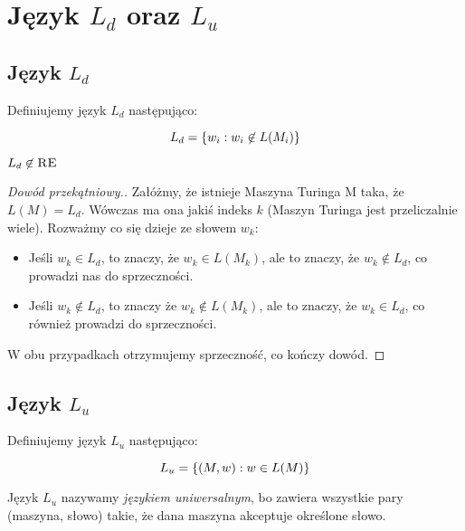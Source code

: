 \section{Język \texorpdfstring{\( L_d \)}{Ld} oraz \texorpdfstring{\(L_u\)}{Lu}}

\subsection{Język \texorpdfstring{\( L_d \)}{Ld}}

\begin{definition}
	Definiujemy język \(L_d\) następująco:

	\[
		L_d = \set{w_i : w_i \not \in L(M_i)}
	\]
\end{definition}

\begin{theorem}
	\( L_d \not \in \textsc{RE} \)
\end{theorem}
\begin{proof}[Dowód przekątniowy.]
	Załóżmy, że istnieje Maszyna Turinga M taka, że \(L(M) = L_d\). Wówczas ma ona jakiś indeks \(k\) (Maszyn Turinga jest przeliczalnie wiele). Rozważmy co się dzieje ze słowem \(w_k\):

	\begin{itemize}
		\item Jeśli \(w_k \in L_d\), to znaczy, że \(w_k \in L(M_k)\), ale to znaczy, że \(w_k \not \in L_d\), co prowadzi nas do sprzeczności.

		\item Jeśli \(w_k \not\in L_d\), to znaczy że \(w_k \not\in L(M_k)\), ale to znaczy, że \(w_k \in L_d\), co również prowadzi do sprzeczności.
	\end{itemize}

	W obu przypadkach otrzymujemy sprzeczność, co kończy dowód.
\end{proof}

\subsection{Język \texorpdfstring{\(L_u\)}{Lu}}

\begin{definition}
	Definiujemy język \(L_u\) następująco:

	\[
		L_u = \set{ (M, w) : w \in L(M)}
	\]

\end{definition}

Język \(L_u\) nazywamy \textit{językiem uniwersalnym}, bo zawiera wszystkie pary (maszyna, słowo) takie, że dana maszyna akceptuje określone słowo.


